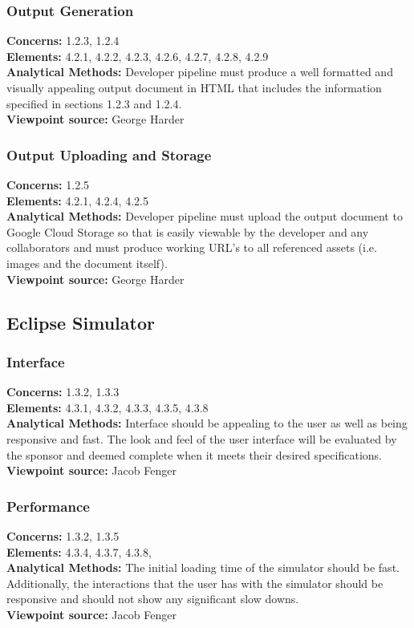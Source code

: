 \documentclass[10pt, onecolumn, draftclsnofoot, letterpaper, compsoc]{IEEEtran}
\begin{document}
    \subsubsection{Output Generation}
    \textbf{Concerns:} 1.2.3, 1.2.4 \\
    \textbf{Elements:} 4.2.1, 4.2.2, 4.2.3, 4.2.6, 4.2.7, 4.2.8, 4.2.9 \\
    \textbf{Analytical Methods:} Developer pipeline must produce a well
    formatted and visually appealing output document in HTML that includes
    the information specified in sections 1.2.3 and 1.2.4. \\
    \textbf{Viewpoint source:} George Harder \\

    \subsubsection{Output Uploading and Storage}
    \textbf{Concerns:} 1.2.5 \\
    \textbf{Elements:} 4.2.1, 4.2.4, 4.2.5 \\
    \textbf{Analytical Methods:} Developer pipeline must upload the output
    document to Google Cloud Storage so that is easily viewable by the developer
    and any collaborators and must produce working URL's to all referenced
    assets (i.e. images and the document itself). \\
    \textbf{Viewpoint source:} George Harder \\

\subsection{Eclipse Simulator}
  \subsubsection{Interface}
  \textbf{Concerns:} 1.3.2, 1.3.3 \\
  \textbf{Elements:} 4.3.1, 4.3.2, 4.3.3, 4.3.5, 4.3.8 \\
  \textbf{Analytical Methods:} Interface should be appealing
  to the user as well as being responsive and fast. The look and feel of the user
  interface will be evaluated by the sponsor and deemed complete when it meets their
  desired specifications. \\
  \textbf{Viewpoint source:} Jacob Fenger \\

  \subsubsection{Performance}
  \textbf{Concerns:} 1.3.2, 1.3.5 \\
  \textbf{Elements:} 4.3.4, 4.3.7, 4.3.8,  \\
  \textbf{Analytical Methods:} The initial loading time
  of the simulator should be fast. Additionally, the
  interactions that the user has with the simulator should
  be responsive and should not show any significant slow
  downs. \\
  \textbf{Viewpoint source:} Jacob Fenger \\
\end{document}
